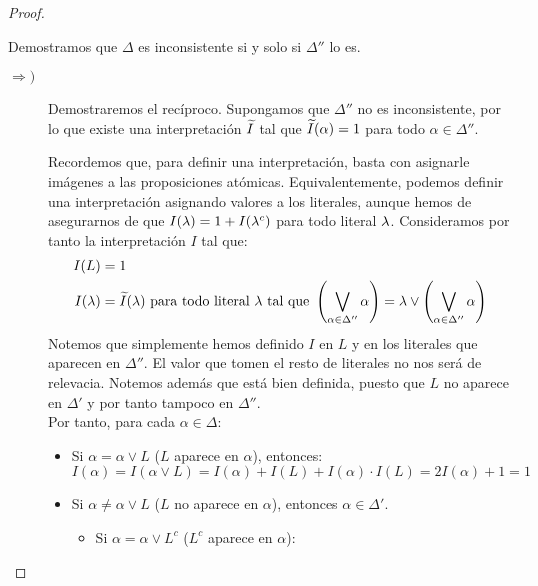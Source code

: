 \begin{teo}
\begin{proof}
\begin{description}
                Demostramos que $\Delta$ es inconsistente si y solo si $\Delta''$ lo es.
                \begin{description}
                    \item[$\Longrightarrow)$] Demostraremos el recíproco. Supongamos que $\Delta''$ no es inconsistente, por lo que existe una interpretación $\widetilde{I}$ tal que $\widetilde{I}(\alpha)=1$ para todo $\alpha\in \Delta''$.

                    Recordemos que, para definir una interpretación, basta con asignarle imágenes a las proposiciones atómicas. Equivalentemente, podemos definir una interpretación asignando valores a los literales, aunque hemos de asegurarnos de que $I(\lambda)=1+I(\lambda^c)$ para todo literal $\lambda$.
                    Consideramos por tanto la interpretación $I$ tal que:
                    \begin{align*}
                        I(L)&=1\\
                        I(\lambda)&=\widetilde{I}(\lambda)\ \text{para todo literal}\ \lambda\ \text{tal que} \ \left(\bigvee_{\alpha\in \Delta''} \alpha\right)=\lambda\lor \left(\bigvee_{\alpha\in \Delta''} \alpha\right)
                    \end{align*}
                    Notemos que simplemente hemos definido $I$ en $L$ y en los literales que aparecen en $\Delta''$. El valor que tomen el resto de literales no nos será de relevacia. Notemos además que está bien definida, puesto que $L$ no aparece en $\Delta'$ y por tanto tampoco en $\Delta''$.\\

                    Por tanto, para cada $\alpha\in \Delta$:
                    \begin{itemize}
                        \item Si $\alpha=\alpha\lor L$ ($L$ aparece en $\alpha$), entonces:
                        \begin{equation*}
                            I(\alpha)=I(\alpha\lor L)=I(\alpha)+I(L)+I(\alpha)\cdot I(L)=2I(\alpha)+1=1
                        \end{equation*}

                        \item Si $\alpha\neq \alpha\lor L$ ($L$ no aparece en $\alpha$), entonces $\alpha\in \Delta'$.
                        \begin{itemize}
                            \item Si $\alpha=\alpha\lor L^c$ ($L^c$ aparece en $\alpha$):
                            

\end{itemize}
\end{itemize}
\end{description}
\end{description}
\end{proof}
\end{teo}
